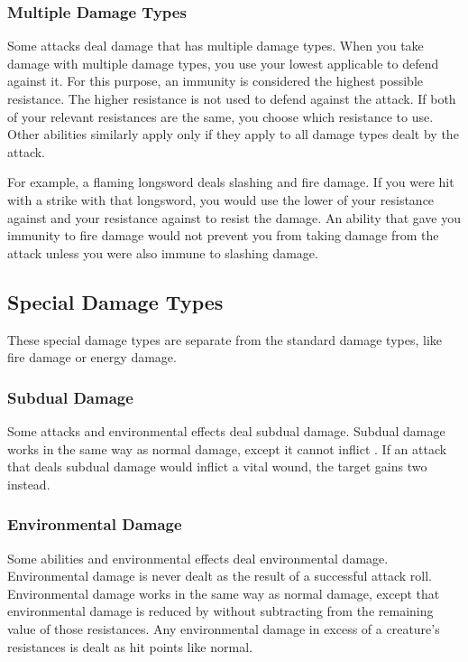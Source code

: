         \subsubsection{Multiple Damage Types}\label{Multiple Damage Types}
            Some attacks deal damage that has multiple damage types.
            When you take damage with multiple damage types, you use your lowest applicable  to defend against it.
            For this purpose, an immunity is considered the highest possible resistance.
            The higher resistance is not used to defend against the attack.
            If both of your relevant resistances are the same, you choose which resistance to use.
            Other abilities similarly apply only if they apply to all damage types dealt by the attack.

            For example, a flaming longsword deals slashing and fire damage.
            If you were hit with a strike with that longsword, you would use the lower of your resistance against  and your resistance against  to resist the damage.
            An ability that gave you immunity to fire damage would not prevent you from taking damage from the attack unless you were also immune to slashing damage.

    \subsection{Special Damage Types}\label{Special Damage Types}

        These special damage types are separate from the standard damage types, like fire damage or energy damage.

        \subsubsection{Subdual Damage}\label{Subdual Damage}
            Some attacks and environmental effects deal subdual damage.
            Subdual damage works in the same way as normal damage, except it cannot inflict .
            If an attack that deals subdual damage would inflict a vital wound, the target gains two  instead.

        \subsubsection{Environmental Damage}\label{Environmental Damage}
            Some abilities and environmental effects deal environmental damage.
            Environmental damage is never dealt as the result of a successful attack roll.
            Environmental damage works in the same way as normal damage, except that environmental damage is reduced by  without subtracting from the remaining value of those resistances.
            Any environmental damage in excess of a creature's resistances is dealt as hit points like normal.

